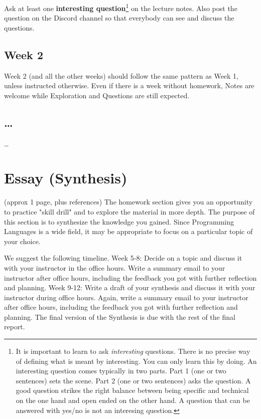 \documentclass{article}
\theoremstyle{theorem}
\theoremstyle{definition}
\theoremstyle{remark}
\begin{document}
Ask at least one \textbf{interesting question}\footnote{It is important to learn to ask \emph{interesting} questions. There is no precise way of defining what is meant by interesting. You can only learn this by doing. An interesting question comes typically in two parts. Part 1 (one or two sentences) sets the scene. Part 2 (one or two sentences) asks the question. A good question strikes the right balance between being specific and technical on the one hand and open ended on the other hand. A question that can be answered with yes/no is not an interesing question.} on the lecture notes. Also post the question on the Discord channel so that everybody can see and discuss the questions.

\subsection{Week 2}

Week 2 (and all the other weeks) should follow the same pattern as Week 1, unless instructed otherwise. Even if there is a week without homework, Notes are welcome while Exploration and Questions are still expected.

\subsection{\ldots}

\ldots

\section{Essay (Synthesis)}

(approx 1 page, plus references) The homework section gives you an opportunity to practice "skill drill" and to explore the material in more depth. The purpose of this section is to synthesize the knowledge you gained. Since Programming Languages is a wide field, it may be appropriate to focus on a particular topic of your choice. 

We suggest the following timeline. Week 5-8: Decide on a topic and discuss it with your instructor in the office hours. Write a summary email to your instructor after office hours, including the feedback you got with further reflection and planning. Week 9-12: Write a draft of your synthesis and discuss it with your instructor during office hours. Again, write a summary email to your instructor after office hours, including the feedback you got with further reflection and planning. The final version of the Synthesis is due with the rest of the final report.
\end{document}
